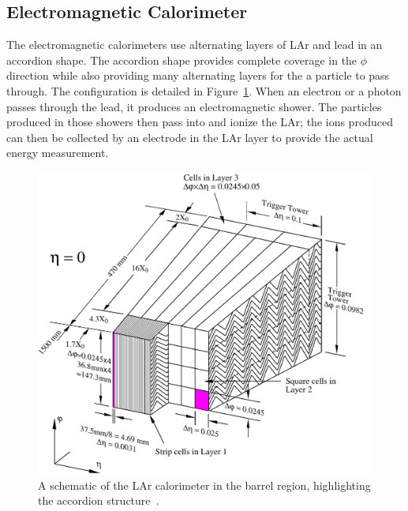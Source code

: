 \subsection{Electromagnetic Calorimeter}

The electromagnetic calorimeters use alternating layers of \acl{LAr} and lead in an accordion shape. 
The accordion shape provides complete coverage in the $\phi$ direction while also providing many alternating layers for the a particle to pass through.
The configuration is detailed in Figure~\ref{fig:calo_barrel_schematic}.
When an electron or a photon passes through the lead, it produces an electromagnetic shower.
The particles produced in those showers then pass into and ionize the \acl{LAr}; the ions produced can then be collected by an electrode in the \acl{LAr} layer to provide the actual energy measurement.

\begin{figure}[hbtp]
\includegraphics[width=\fullfig]{figures/calo_barrel_schematic.pdf}
\caption{A schematic of the \acs*{LAr} calorimeter in the barrel region, highlighting the accordion structure~\cite{atlas_experiment}.}
\label{fig:calo_barrel_schematic}
\end{figure}

